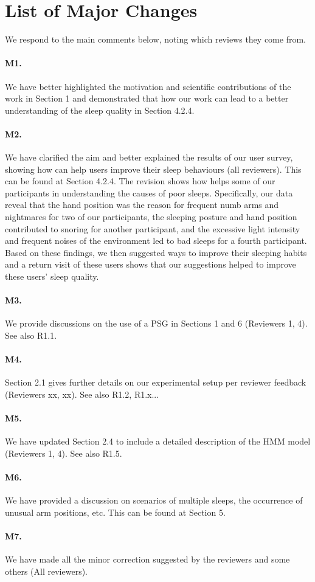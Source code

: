\section*{List of Major Changes}

We respond to the main comments below, noting which reviews they come from.

\paragraph{M1.} We have better highlighted the motivation and scientific contributions of the work in Section 1 and demonstrated that how our work can lead to
a better understanding of the sleep quality in Section 4.2.4.

\paragraph{M2.} We have clarified the aim and better explained the results of our user survey, showing how \systemname can help users
improve their sleep behaviours (all reviewers). This can be found at Section 4.2.4. The revision shows how \systemname helps some of our
participants in understanding the causes of poor sleeps. Specifically, our data reveal that the hand position was the reason for frequent
numb arms and nightmares for two of our participants, the sleeping posture and hand position contributed to snoring for another
participant, and the excessive light intensity and frequent noises of the environment led to bad sleeps for a fourth participant. Based on
these findings, we then suggested ways to improve their sleeping habits and a return visit
of these users shows that our suggestions helped to improve these users' sleep quality.

\paragraph{M3.} We provide discussions on the use of a PSG in Sections 1 and 6 (Reviewers 1, 4). See also R1.1.

\paragraph{M4.} Section 2.1 gives further details on our experimental setup per reviewer feedback (Reviewers xx, xx). See also R1.2,
R1.x...

\paragraph{M5.} We have updated Section 2.4 to include a detailed description of the HMM model (Reviewers 1, 4). See also R1.5.



\paragraph{M6.} We have provided a discussion on scenarios of multiple sleeps, the occurrence of unusual arm positions, etc. This can be
found at Section 5.

\paragraph{M7.} We have made all the minor correction suggested by the reviewers and some others (All reviewers).
